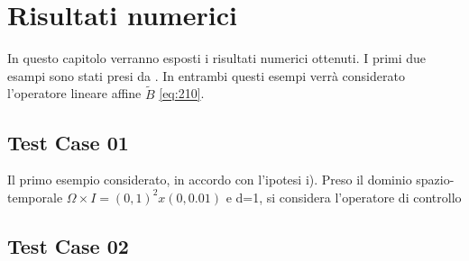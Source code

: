 \chapter{Risultati numerici}
\label{chap:Results}
In questo capitolo verranno esposti i risultati numerici ottenuti.
I primi due esampi sono stati presi da \cite{MAIN}.
In entrambi questi esempi verrà considerato l'operatore lineare affine $\tilde{B}$ \ref{eq:210}.

\section{Test Case 01}
Il primo esempio considerato, in accordo con l'ipotesi i).
Preso il dominio spazio-temporale $\Omega \times I = (0,1)^2 x(0,0.01)$ e d=1, si considera l'operatore di controllo

\section{Test Case 02}